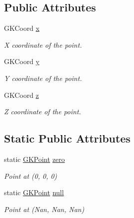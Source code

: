 \subsection*{Public Attributes}
\begin{DoxyCompactItemize}
\item 
G\+K\+Coord \hyperlink{classGKPoint_ae616939b95941353b9d23b282332cbfc}{x}\hypertarget{classGKPoint_ae616939b95941353b9d23b282332cbfc}{}\label{classGKPoint_ae616939b95941353b9d23b282332cbfc}

\begin{DoxyCompactList}\small\item\em X coordinate of the point. \end{DoxyCompactList}\item 
G\+K\+Coord \hyperlink{classGKPoint_a839ef379a0dc82f99a7a047393aa6b88}{y}\hypertarget{classGKPoint_a839ef379a0dc82f99a7a047393aa6b88}{}\label{classGKPoint_a839ef379a0dc82f99a7a047393aa6b88}

\begin{DoxyCompactList}\small\item\em Y coordinate of the point. \end{DoxyCompactList}\item 
G\+K\+Coord \hyperlink{classGKPoint_a13dc31f05fc7e7fd3bae4c66f7743207}{z}\hypertarget{classGKPoint_a13dc31f05fc7e7fd3bae4c66f7743207}{}\label{classGKPoint_a13dc31f05fc7e7fd3bae4c66f7743207}

\begin{DoxyCompactList}\small\item\em Z coordinate of the point. \end{DoxyCompactList}\end{DoxyCompactItemize}
\subsection*{Static Public Attributes}
\begin{DoxyCompactItemize}
\item 
static \hyperlink{classGKPoint}{G\+K\+Point} \hyperlink{classGKPoint_afac9d48f41ae62702ef6af86b104951b}{zero}\hypertarget{classGKPoint_afac9d48f41ae62702ef6af86b104951b}{}\label{classGKPoint_afac9d48f41ae62702ef6af86b104951b}

\begin{DoxyCompactList}\small\item\em Point at (0, 0, 0) \end{DoxyCompactList}\item 
static \hyperlink{classGKPoint}{G\+K\+Point} \hyperlink{classGKPoint_a50dcde8d809f19aa064f1c9cc71b372b}{null}\hypertarget{classGKPoint_a50dcde8d809f19aa064f1c9cc71b372b}{}\label{classGKPoint_a50dcde8d809f19aa064f1c9cc71b372b}

\begin{DoxyCompactList}\small\item\em Point at (Nan, Nan, Nan) \end{DoxyCompactList}\end{DoxyCompactItemize}
